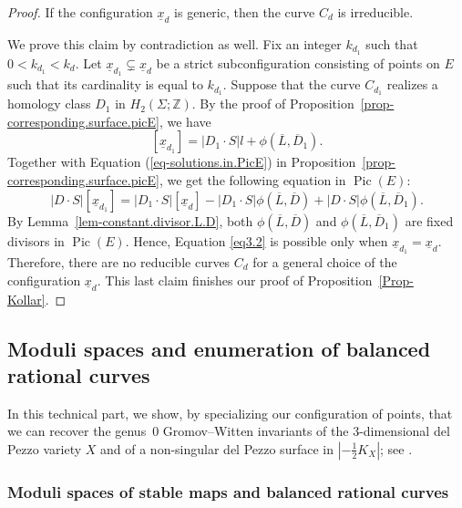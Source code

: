 \documentclass[11pt]{amsart}
\numberwithin{equation}{section}
\theoremstyle{definition}
\theoremstyle{plain}
\theoremstyle{remark}
\newenvironment{claim}[1]{\renewcommand\theinnercustomclaim{#1}\innercustomclaim}{\endinnercustomclaim}
\newcommand{\Z}{\mathbb{Z}}
\DeclareMathOperator{\Pic}{Pic}
\begin{document}
\begin{proof}
\begin{claim}{2C}\label{lem44}
  If the configuration $\underline{x}_d$ is generic, then the curve $C_d$ is irreducible.
\end{claim}

We prove this claim  by contradiction as well. 
Fix an integer $k_{d_1}$ such that $0<k_{d_1}<k_d$. Let $\underline{x}_{d_1}\subsetneq \underline{x}_d$ be a strict subconfiguration consisting of points on $E$ such that its cardinality is equal to $k_{d_1}$. Suppose that the curve $C_{d_1}$ realizes a homology class $D_{1}$ in $H_2(\Sigma;\Z)$. By the proof of Proposition~\ref{prop-corresponding.surface.picE}, we have
$$\left[\underline{x}_{d_1}\right]=|D_1\cdot S|l+\phi\left(\overline{L},\overline{D}_1\right).$$
Together with Equation (\ref{eq-solutions.in.PicE}) in Proposition~\ref{prop-corresponding.surface.picE}, we get the following equation in $\Pic(E)$: 
\begin{equation}\label{eq3.2}
    |D\cdot S|\left[\underline{x}_{d_1}\right]=|D_1\cdot S|\left[\underline{x}_d\right]-|D_1\cdot S|\phi \left(\overline{L},\overline{D}\right)+|D\cdot S|\phi\left(\overline{L},\overline{D}_1\right).
\end{equation}
By Lemma~\ref{lem-constant.divisor.L.D}, both $\phi (\overline{L},\overline{D})$ and $\phi(\overline{L},\overline{D}_1)$ are fixed divisors in $\Pic(E)$. Hence, Equation \eqref{eq3.2} is possible only when $\underline{x}_{d_1}=\underline{x}_{d}$. Therefore, there are no reducible curves $C_d$ for a general choice of the configuration $\underline{x}_{d}$.  
This last claim finishes our proof of Proposition~\ref{Prop-Kollar}.
    \end{proof}

\subsection{Moduli spaces and enumeration of balanced rational  curves}
In this technical part, we show, by specializing our configuration of points, that we can recover the genus~$0$ Gromov--Witten invariants of the $3$-dimensional del Pezzo variety $X$ and of a non-singular del Pezzo surface in $|-\frac{1}{2}K_X|$; see \cite[Section 5]{brugalle2016pencils}. 

\subsubsection{Moduli spaces of stable maps and balanced rational curves} 
\end{document}
